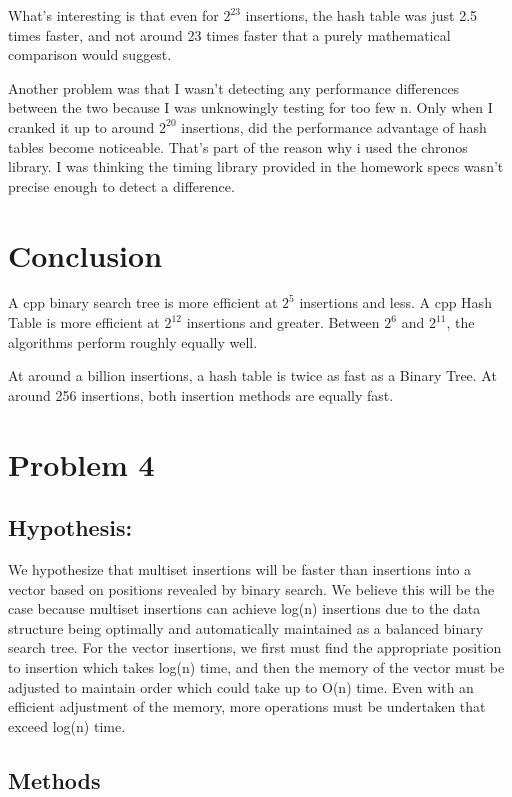 \documentclass[11pt]{article}
\begin{document}
What's interesting is that even for \(2^{23}\) insertions, the hash
table was just 2.5 times faster, and not around 23 times faster that a
purely mathematical comparison would suggest.

Another problem was that I wasn't detecting any performance differences
between the two because I was unknowingly testing for too few n. Only
when I cranked it up to around \(2^{20}\) insertions, did the
performance advantage of hash tables become noticeable. That's part of
the reason why i used the chronos library. I was thinking the timing
library provided in the homework specs wasn't precise enough to detect a
difference.

    \section{Conclusion}\label{conclusion}

A cpp binary search tree is more efficient at \(2^5\) insertions and
less. A cpp Hash Table is more efficient at \(2^12\) insertions and
greater. Between \(2^6\) and \(2^{11}\), the algorithms perform roughly
equally well.

At around a billion insertions, a hash table is twice as fast as a
Binary Tree. At around 256 insertions, both insertion methods are
equally fast.

    \section{Problem 4}\label{problem-4}

    \subsection{Hypothesis:}\label{hypothesis}

We hypothesize that multiset insertions will be faster than insertions
into a vector based on positions revealed by binary search. We believe
this will be the case because multiset insertions can achieve log(n)
insertions due to the data structure being optimally and automatically
maintained as a balanced binary search tree. For the vector insertions,
we first must find the appropriate position to insertion which takes
log(n) time, and then the memory of the vector must be adjusted to
maintain order which could take up to O(n) time. Even with an efficient
adjustment of the memory, more operations must be undertaken that exceed
log(n) time.

    \subsection{Methods}\label{methods}
\end{document}
